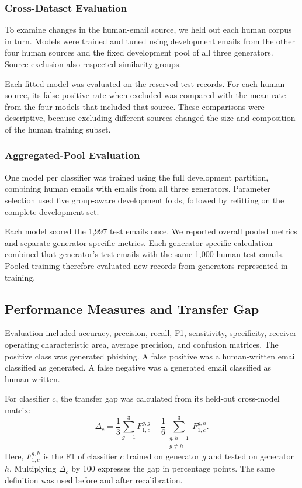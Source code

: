 \documentclass[conference]{IEEEtran}
\begin{document}
\subsubsection{Cross-Dataset Evaluation}

To examine changes in the human-email source, we held out
each human corpus in turn. Models were trained and tuned using
development emails from the other four human sources and
the fixed development pool of all three generators. Source
exclusion also respected similarity groups.

Each fitted model was evaluated on the reserved test records.
For each human source, its false-positive rate when excluded
was compared with the mean rate from the four models that
included that source. These comparisons were descriptive,
because excluding different sources changed the size and
composition of the human training subset.

\subsubsection{Aggregated-Pool Evaluation}

One model per classifier was trained using the full development
partition, combining human emails with emails from all three
generators. Parameter selection used five group-aware development
folds, followed by refitting on the complete development set.

Each model scored the 1,997 test emails once. We reported
overall pooled metrics and separate generator-specific metrics.
Each generator-specific calculation combined that generator's
test emails with the same 1,000 human test emails. Pooled
training therefore evaluated new records from generators
represented in training.

\subsection{Performance Measures and Transfer Gap}

Evaluation included accuracy, precision, recall, F1, sensitivity,
specificity, receiver operating characteristic area, average
precision, and confusion matrices. The positive class was
generated phishing. A false positive was a human-written email
classified as generated. A false negative was a generated email
classified as human-written.

For classifier $c$, the transfer gap was calculated from its
held-out cross-model matrix:
\begin{equation}
\Delta_c =
\frac{1}{3}\sum_{g=1}^{3} F_{1,c}^{g,g}
-
\frac{1}{6}
\sum_{\substack{g,h=1\\g\ne h}}^{3} F_{1,c}^{g,h}.
\label{eq:transfer-gap}
\end{equation}
Here, $F_{1,c}^{g,h}$ is the F1 of classifier $c$ trained on
generator $g$ and tested on generator $h$. Multiplying
$\Delta_c$ by 100 expresses the gap in percentage points.
The same definition was used before and after recalibration.
\end{document}
